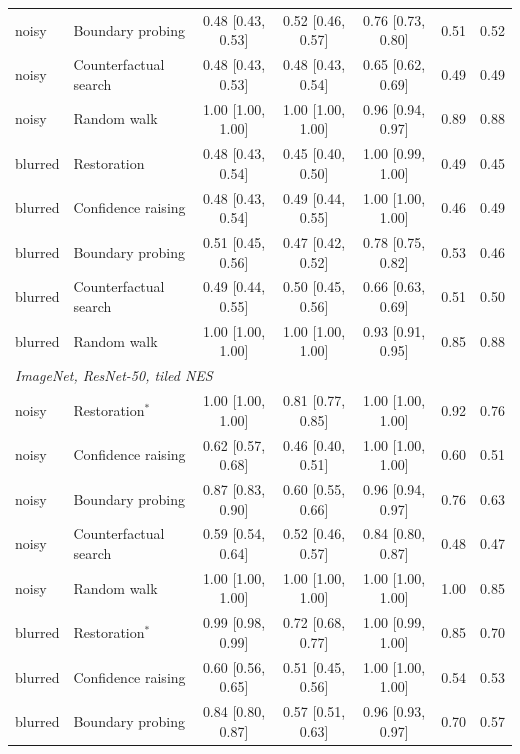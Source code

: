 \begin{landscape}
\begin{footnotesize}
\begin{longtable}{@{\extracolsep{\fill}}llccccc@{}}
\quad noisy & Boundary probing & 0.48 {[}0.43, 0.53{]} & 0.52 {[}0.46, 0.57{]} & 0.76 {[}0.73, 0.80{]} & 0.51 & 0.52 \\
\quad noisy & Counterfactual search & 0.48 {[}0.43, 0.53{]} & 0.48 {[}0.43, 0.54{]} & 0.65 {[}0.62, 0.69{]} & 0.49 & 0.49 \\
\quad noisy & Random walk & 1.00 {[}1.00, 1.00{]} & 1.00 {[}1.00, 1.00{]} & 0.96 {[}0.94, 0.97{]} & 0.89 & 0.88 \\
\quad blurred & Restoration & 0.48 {[}0.43, 0.54{]} & 0.45 {[}0.40, 0.50{]} & 1.00 {[}0.99, 1.00{]} & 0.49 & 0.45 \\
\quad blurred & Confidence raising & 0.48 {[}0.43, 0.54{]} & 0.49 {[}0.44, 0.55{]} & 1.00 {[}1.00, 1.00{]} & 0.46 & 0.49 \\
\quad blurred & Boundary probing & 0.51 {[}0.45, 0.56{]} & 0.47 {[}0.42, 0.52{]} & 0.78 {[}0.75, 0.82{]} & 0.53 & 0.46 \\
\quad blurred & Counterfactual search & 0.49 {[}0.44, 0.55{]} & 0.50 {[}0.45, 0.56{]} & 0.66 {[}0.63, 0.69{]} & 0.51 & 0.50 \\
\quad blurred & Random walk & 1.00 {[}1.00, 1.00{]} & 1.00 {[}1.00, 1.00{]} & 0.93 {[}0.91, 0.95{]} & 0.85 & 0.88 \\
\multicolumn{7}{l}{\emph{ImageNet, ResNet-50, tiled NES}} \\
\quad noisy & Restoration$^{\ast}$ & 1.00 {[}1.00, 1.00{]} & 0.81 {[}0.77, 0.85{]} & 1.00 {[}1.00, 1.00{]} & 0.92 & 0.76 \\
\quad noisy & Confidence raising & 0.62 {[}0.57, 0.68{]} & 0.46 {[}0.40, 0.51{]} & 1.00 {[}1.00, 1.00{]} & 0.60 & 0.51 \\
\quad noisy & Boundary probing & 0.87 {[}0.83, 0.90{]} & 0.60 {[}0.55, 0.66{]} & 0.96 {[}0.94, 0.97{]} & 0.76 & 0.63 \\
\quad noisy & Counterfactual search & 0.59 {[}0.54, 0.64{]} & 0.52 {[}0.46, 0.57{]} & 0.84 {[}0.80, 0.87{]} & 0.48 & 0.47 \\
\quad noisy & Random walk & 1.00 {[}1.00, 1.00{]} & 1.00 {[}1.00, 1.00{]} & 1.00 {[}1.00, 1.00{]} & 1.00 & 0.85 \\
\quad blurred & Restoration$^{\ast}$ & 0.99 {[}0.98, 0.99{]} & 0.72 {[}0.68, 0.77{]} & 1.00 {[}0.99, 1.00{]} & 0.85 & 0.70 \\
\quad blurred & Confidence raising & 0.60 {[}0.56, 0.65{]} & 0.51 {[}0.45, 0.56{]} & 1.00 {[}1.00, 1.00{]} & 0.54 & 0.53 \\
\quad blurred & Boundary probing & 0.84 {[}0.80, 0.87{]} & 0.57 {[}0.51, 0.63{]} & 0.96 {[}0.93, 0.97{]} & 0.70 & 0.57 \\

\end{longtable}
\end{footnotesize}
\end{landscape}

